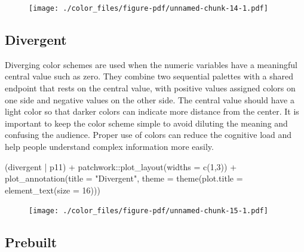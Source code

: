 \documentclass[
  letterpaper,
]{book}
\newenvironment{Shaded}{\begin{snugshade}}{\end{snugshade}}
\newcommand{\AttributeTok}[1]{\textcolor[rgb]{0.40,0.45,0.13}{#1}}
\newcommand{\DecValTok}[1]{\textcolor[rgb]{0.68,0.00,0.00}{#1}}
\newcommand{\FunctionTok}[1]{\textcolor[rgb]{0.28,0.35,0.67}{#1}}
\newcommand{\NormalTok}[1]{\textcolor[rgb]{0.00,0.23,0.31}{#1}}
\newcommand{\SpecialCharTok}[1]{\textcolor[rgb]{0.37,0.37,0.37}{#1}}
\newcommand{\StringTok}[1]{\textcolor[rgb]{0.13,0.47,0.30}{#1}}
\begin{document}
\begin{figure}[H]

{\centering \texttt{[image: ./color\_files/figure-pdf/unnamed-chunk-14-1.pdf]}

}

\end{figure}

\hypertarget{divergent}{%
\subsection{Divergent}\label{divergent}}

Diverging color schemes are used when the numeric variables have a
meaningful central value such as zero. They combine two sequential
palettes with a shared endpoint that rests on the central value, with
positive values assigned colors on one side and negative values on the
other side. The central value should have a light color so that darker
colors can indicate more distance from the center. It is important to
keep the color scheme simple to avoid diluting the meaning and confusing
the audience. Proper use of colors can reduce the cognitive load and
help people understand complex information more easily.

\begin{Shaded}
\begin{Highlighting}[]
\NormalTok{(divergent }\SpecialCharTok{|}\NormalTok{ p11) }\SpecialCharTok{+} 
\NormalTok{  patchwork}\SpecialCharTok{::}\FunctionTok{plot\_layout}\NormalTok{(}\AttributeTok{widths =} \FunctionTok{c}\NormalTok{(}\DecValTok{1}\NormalTok{,}\DecValTok{3}\NormalTok{)) }\SpecialCharTok{+} 
  \FunctionTok{plot\_annotation}\NormalTok{(}\AttributeTok{title =} \StringTok{"Divergent"}\NormalTok{,}
                  \AttributeTok{theme =} \FunctionTok{theme}\NormalTok{(}\AttributeTok{plot.title =} \FunctionTok{element\_text}\NormalTok{(}\AttributeTok{size =} \DecValTok{16}\NormalTok{)))}
\end{Highlighting}
\end{Shaded}

\begin{figure}[H]

{\centering \texttt{[image: ./color\_files/figure-pdf/unnamed-chunk-15-1.pdf]}

}

\end{figure}

\hypertarget{prebuilt}{%
\subsection{Prebuilt}\label{prebuilt}}
\end{document}
